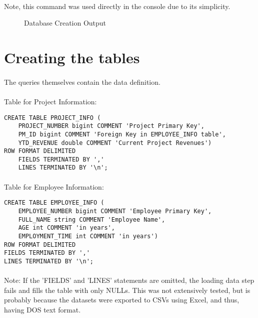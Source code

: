 \paragraph{}Note, this command was used directly in the console due to its simplicity.

\begin{figure}[H]
	\centering
	\caption{Database Creation Output}
\end{figure}

\section{Creating the tables}
\paragraph{}The queries themselves contain the data definition. 

\paragraph{}Table for Project Information: 
\begin{lstlisting}
CREATE TABLE PROJECT_INFO (
	PROJECT_NUMBER bigint COMMENT 'Project Primary Key',
	PM_ID bigint COMMENT 'Foreign Key in EMPLOYEE_INFO table',
	YTD_REVENUE double COMMENT 'Current Project Revenues')
ROW FORMAT DELIMITED
	FIELDS TERMINATED BY ','
	LINES TERMINATED BY '\n';
\end{lstlisting}

\paragraph{}Table for Employee Information: 
\begin{lstlisting}
CREATE TABLE EMPLOYEE_INFO (
	EMPLOYEE_NUMBER bigint COMMENT 'Employee Primary Key',
	FULL_NAME string COMMENT 'Employee Name',
	AGE int COMMENT 'in years',
	EMPLOYMENT_TIME int COMMENT 'in years')
ROW FORMAT DELIMITED
FIELDS TERMINATED BY ','
LINES TERMINATED BY '\n';
\end{lstlisting}

\paragraph{}Note: If the 'FIELDS' and 'LINES' statements are omitted, the loading data step fails and fills the table with only NULLs. This was not extensively tested, but is probably because the datasets were exported to CSVs using Excel, and thus, having DOS text format.

